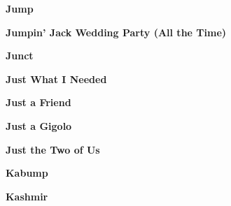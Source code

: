 \newline
\vspace{10pt} 
\begin{center}\textbf{Jump}\end{center}
\newline
\vspace{10pt} 
\begin{center}\textbf{Jumpin' Jack Wedding Party (All the Time)}\end{center}
\newline
\vspace{10pt} 
\begin{center}\textbf{Junct}\end{center}
\newline
\vspace{10pt} 
\begin{center}\textbf{Just What I Needed}\end{center}
\newline
\vspace{10pt} 
\begin{center}\textbf{Just a Friend}\end{center}
\newline
\vspace{10pt} 
\begin{center}\textbf{Just a Gigolo}\end{center}
\newline
\vspace{10pt} 
\begin{center}\textbf{Just the Two of Us}\end{center}
\newline
\vspace{10pt} 
\begin{center}\textbf{Kabump}\end{center}
\newline
\vspace{10pt} 
\begin{center}\textbf{Kashmir}\end{center}
\newline
\vspace{10pt} 
